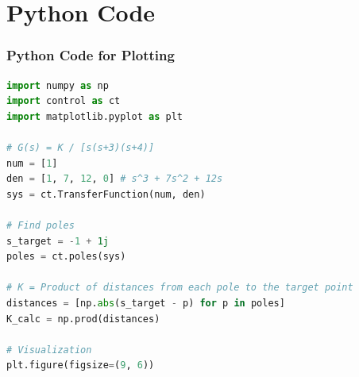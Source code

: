 \documentclass{beamer}
\theoremstyle{remark}
\numberwithin{equation}{section}
\begin{document}
\section{Python Code}
\begin{frame}[fragile]
\frametitle{Python Code for Plotting}
\begin{lstlisting}[language=Python]
import numpy as np
import control as ct
import matplotlib.pyplot as plt

# G(s) = K / [s(s+3)(s+4)]
num = [1]
den = [1, 7, 12, 0] # s^3 + 7s^2 + 12s
sys = ct.TransferFunction(num, den)

# Find poles
s_target = -1 + 1j
poles = ct.poles(sys)

# K = Product of distances from each pole to the target point
distances = [np.abs(s_target - p) for p in poles]
K_calc = np.prod(distances)

# Visualization
plt.figure(figsize=(9, 6))


\end{lstlisting}
\end{frame}
 
\end{document}
